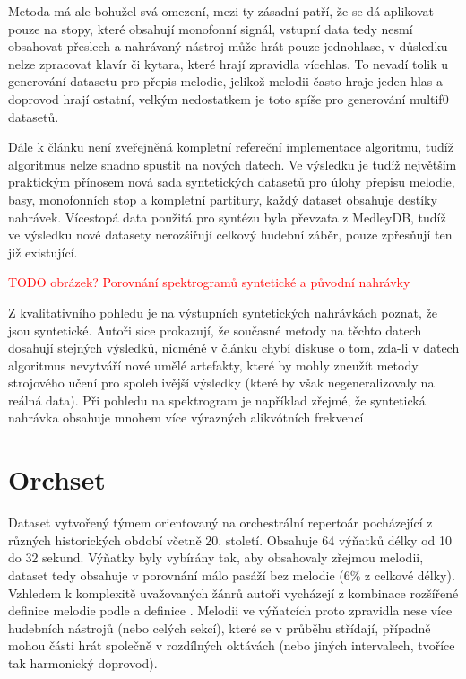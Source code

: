 Metoda má ale bohužel svá omezení, mezi ty zásadní patří, že se dá aplikovat pouze na stopy, které obsahují monofonní signál, vstupní data tedy nesmí obsahovat přeslech a nahrávaný nástroj může hrát pouze jednohlase, v důsledku nelze zpracovat klavír či kytara, které hrají zpravidla vícehlas. To nevadí tolik u generování datasetu pro přepis melodie, jelikož melodii často hraje jeden hlas a doprovod hrají ostatní, velkým nedostatkem je toto spíše pro generování multif0 datasetů.

Dále k článku není zveřejněná kompletní refereční implementace algoritmu, tudíž algoritmus nelze snadno spustit na nových datech. Ve výsledku je tudíž největším praktickým přínosem nová sada syntetických datasetů pro úlohy přepisu melodie, basy, monofonních stop a kompletní partitury, každý dataset obsahuje destíky nahrávek. Vícestopá data použitá pro syntézu byla převzata z MedleyDB, tudíž ve výsledku nové datasety nerozšiřují celkový hudební záběr, pouze zpřesňují ten již existující.

\textcolor{red}{TODO obrázek? Porovnání spektrogramů syntetické a původní nahrávky}

Z kvalitativního pohledu je na výstupních syntetických nahrávkách poznat, že jsou syntetické. Autoři sice prokazují, že současné metody na těchto datech dosahují stejných výsledků, nicméně v článku chybí diskuse o tom, zda-li v datech algoritmus nevytváří nové umělé artefakty, které by mohly zneužít metody strojového učení pro spolehlivější výsledky (které by však negeneralizovaly na reálná data). Při pohledu na spektrogram je například zřejmé, že syntetická nahrávka obsahuje mnohem více výrazných alikvótních frekvencí

\section{Orchset}

Dataset vytvořený týmem \cite{Bosch2016} orientovaný na orchestrální repertoár pocházející z různých historických období včetně 20. století. Obsahuje 64 výňatků délky od 10 do 32 sekund. Výňatky byly vybírány tak, aby obsahovaly zřejmou melodii, dataset tedy obsahuje v porovnání málo pasáží bez melodie (6\% z celkové délky). Vzhledem k komplexitě uvažovaných žánrů autoři vycházejí z kombinace rozšířené definice melodie podle \cite{Bittner2014} a definice \cite{Poliner2007}. Melodii ve výňatcích proto zpravidla nese více hudebních nástrojů (nebo celých sekcí), které se v průběhu střídají, případně mohou části hrát společně v rozdílných oktávách (nebo jiných intervalech, tvoříce tak harmonický doprovod). 

